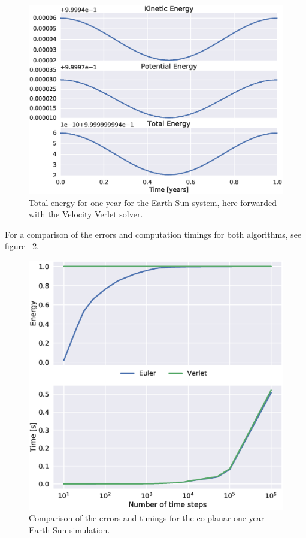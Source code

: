 \documentclass[aps,reprint]{revtex4-1}
\begin{document}
\begin{figure}[H]
  \includegraphics[width=\columnwidth]{figures/energy_verlet.eps}
  \caption{Total energy for one year for the Earth-Sun system, here forwarded
  with the Velocity Verlet solver.}
  \label{fig:verletenergy}
\end{figure}

For a comparison of the errors and computation timings for both algorithms, see
figure ~\ref{fig:timing}.

\begin{figure}[H]
  \includegraphics[width=\columnwidth]{figures/timing.eps}
  \caption{Comparison of the errors and timings for the co-planar one-year Earth-Sun
  simulation.}
  \label{fig:timing}
\end{figure}
\end{document}
